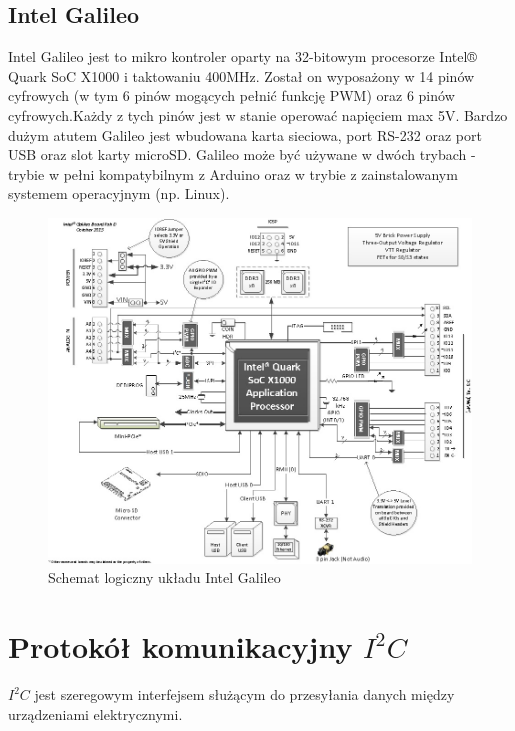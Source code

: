 \documentclass{xmgr}
\begin{document}
\subsection{Intel Galileo}
Intel Galileo jest  to mikro kontroler oparty na 32-bitowym procesorze Intel® Quark SoC X1000 i taktowaniu 400MHz. Został on wyposażony w 14 pinów cyfrowych (w tym 6 pinów mogących pełnić funkcję PWM) oraz 6 pinów cyfrowych.Każdy z tych pinów jest w stanie operować napięciem max 5V. Bardzo dużym atutem Galileo jest wbudowana karta sieciowa, port RS-232 oraz port USB oraz slot karty microSD. Galileo może być używane w dwóch trybach - trybie w pełni kompatybilnym z Arduino oraz w trybie z zainstalowanym systemem operacyjnym (np. Linux).
\begin{figure}[!h]
    \centering
    \includegraphics[height=0.8\textwidth]{images/IntelGalileoLogicSchematics.jpg}
    \caption{Schemat logiczny układu Intel Galileo\label{IntelGalileoLogicSchematics}}
\end{figure}


\section{Protokół komunikacyjny $I^2C$}
\emph{$I^2C$} jest szeregowym interfejsem służącym do przesyłania danych między urządzeniami elektrycznymi. 
\end{document}
